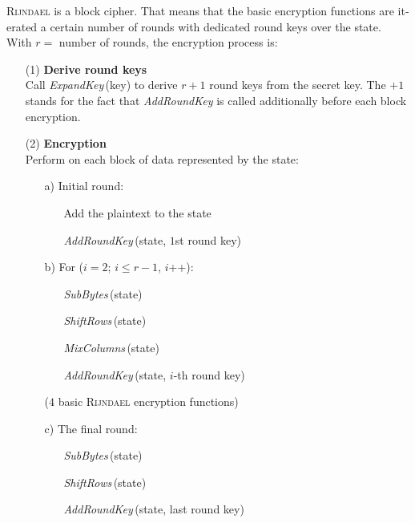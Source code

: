 \documentclass[a4paper,11pt]{article}
\begin{document}
\begin{otherlanguage}{english}
\begin{multicols}{2}
\noindent
\textsc{Rijndael} is a block cipher. That means that the basic encryption functions are iterated a certain number of rounds with dedicated round keys over the state. With $r = $ number of rounds, the encryption process is:\\

\begin{itemize} [noitemsep, nolistsep]
\item[(1)] \textbf{Derive round keys}\\
Call \textit{ExpandKey}\,(key) to derive $r+1$ round keys from the secret key. The $+ 1$ stands for the fact that \textit{Add\-RoundKey} is called additionally before each block encryption. 
\vspace{0.1cm}
\item[(2)] \textbf{Encryption}\\
Perform on each block of data represented by the \glqq state\grqq: 
\vspace{0.1cm}
  \begin{itemize} [noitemsep, nolistsep]
    \item[a)] Initial round:
      \begin{itemize} [noitemsep, nolistsep]
        \item[] Add the plaintext to the state 
        \item[] \textit{AddRoundKey}\,(state, $1$st round key)
      \end{itemize} 
    \vspace{0.1cm}
    \item[b)] For ($i=2$; $i\leq r-1$, $i$++):
    \vspace{0.1cm}
    \begin{itemize} [noitemsep, nolistsep]
        \item[] \textit{SubBytes}\,(state) 
        \item[] \textit{ShiftRows}\,(state) 
        \item[] \textit{MixColumns}\,(state) 
        \item[] \textit{AddRoundKey}\,(state, $i$-th round key) 
    \end{itemize} 
    \vspace{0.1cm}
    ($4$ basic \textsc{Rijndael} encryption functions)
    \vspace{0.1cm}
    \item[c)] The final round:
    \begin{itemize} [noitemsep, nolistsep]
        \item[] \textit{SubBytes}\,(state)
        \item[] \textit{ShiftRows}\,(state)
        \item[] \textit{AddRoundKey}\,(state, last round key) 
    \end{itemize} 
  \end{itemize}
\end{itemize}
\vspace{0.5cm}


\end{multicols}
\end{otherlanguage}
\end{document}
